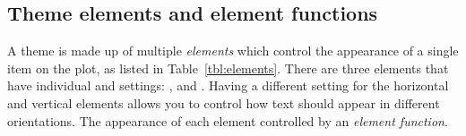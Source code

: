 % 
% 
% 
% 


\subsection{Theme elements and element functions}
\label{sec:theme_elements}

A theme is made up of multiple \emph{elements} which control the appearance of a single item on the plot, as listed in Table~\ref{tbl:elements}. There are three elements that have individual  and  settings: ,  and . Having a different setting for the horizontal and vertical elements allows you to control how text should appear in different orientations. The appearance of each element controlled by an \emph{element function}.

